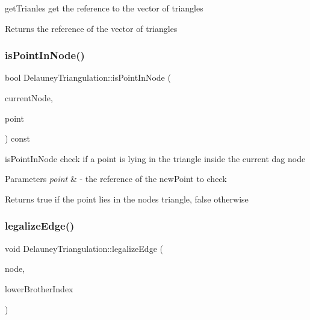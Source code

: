 get\+Trianles get the reference to the vector of triangles 

\begin{DoxyReturn}{Returns}
the reference of the vector of triangles 
\end{DoxyReturn}
\mbox{\label{classDelauneyTriangulation_ada3abfc19b784c0a59ad543719013060}} 
\subsubsection{\texorpdfstring{is\+Point\+In\+Node()}{isPointInNode()}}
{\footnotesize\ttfamily bool Delauney\+Triangulation\+::is\+Point\+In\+Node (\begin{DoxyParamCaption}\item[{\hyperlink{classDagNode}{Dag\+Node} $\ast$\&}]{current\+Node,  }\item[{const cg3\+::\+Point2\+Dd \&}]{point }\end{DoxyParamCaption}) const\hspace{0.3cm}{\ttfamily [inline]}}



is\+Point\+In\+Node check if a point is lying in the triangle inside the current dag node 


\begin{DoxyParams}{Parameters}
{\em point} & -\/ the reference of the new\+Point to check \\
\hline
\end{DoxyParams}
\begin{DoxyReturn}{Returns}
true if the point lies in the node\textquotesingle{}s triangle, false otherwise 
\end{DoxyReturn}
\mbox{\label{classDelauneyTriangulation_a0864810211f778b5e8fc0ae67825e158}} 
\subsubsection{\texorpdfstring{legalize\+Edge()}{legalizeEdge()}}
{\footnotesize\ttfamily void Delauney\+Triangulation\+::legalize\+Edge (\begin{DoxyParamCaption}\item[{\hyperlink{classDagNode}{Dag\+Node} $\ast$}]{node,  }\item[{size\+\_\+t}]{lower\+Brother\+Index }\end{DoxyParamCaption})}



